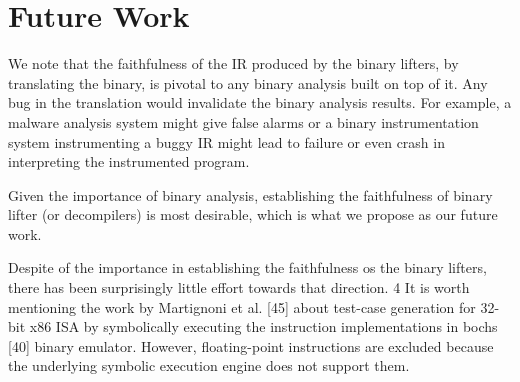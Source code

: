 \section{Future Work}\label{sec:problem}

We note that the faithfulness of the IR produced by the binary lifters, by
translating the binary, is pivotal to any binary analysis built on top of it.
Any bug in the translation would invalidate the binary analysis results. For
example, a malware analysis system might give false alarms or a binary
instrumentation system instrumenting a buggy IR might lead to failure or even
crash in interpreting the instrumented program. 

Given the importance of binary analysis, establishing the faithfulness of
binary lifter (or decompilers) is most desirable, which is what we propose as
our future work.

Despite of the importance in establishing the faithfulness os the binary lifters,
there has been surprisingly little effort towards that direction. 
4 It
is worth mentioning the work by Martignoni et al. [45] about test-case
generation for 32-bit x86 ISA by symbolically executing the instruction
implementations in bochs [40] binary emulator. However, floating-point
instructions are excluded because the underlying symbolic execution engine
does not support them.

